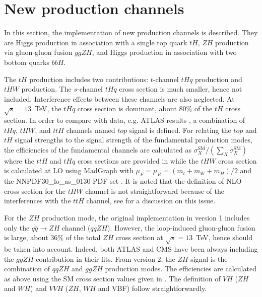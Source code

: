 \clearpage
\section{New production channels} \label{sec:new_production}
In this section, the implementation of new production channels is described. 
They are Higgs production in association with a single top quark $tH$, $ZH$ production via gluon-gluon 
fusion $ggZH$, and Higgs production in association with two bottom quarks $bbH$. 

The $tH$ production includes two contributions: $t$-channel $tHq$ production and $tHW$ production. 
The $s$-channel $tHq$ cross section is much smaller, hence not included. Interference effects between these 
channels are also neglected. At $\sqrt{s} = 13$~TeV, the $tHq$ cross section is dominant, about $80\%$ of the $tH$ cross section. 
In order to compare with data, e.g. ATLAS results \cite{Aaboud:2018xdt}, a combination of $tHq$, $tHW$, and $ttH$ channels named $top$ signal 
is defined. For relating the $top$ and $tH$ signal 
strengths to the signal strength of the fundamental production modes, 
the efficiencies of the fundamental channels are calculated as $\sigma^\text{SM}_X/(\sum_X \sigma^\text{SM}_X)$ where the $ttH$ and $tHq$ cross sections are provided in \cite{deFlorian:2016spz} while the $tHW$ cross section is 
calculated at LO using MadGraph \cite{Alwall:2014hca} with $\mu_F = \mu_R = (m_t + m_W + m_H)/2$ 
and the NNPDF30\_lo\_as\_0130 PDF set \cite{Ball:2014uwa}. It is noted that the definition of NLO cross section for the $tHW$ channel 
is not straightforward because of the interferences with the $ttH$ channel, see \cite{Demartin:2016axk} for a discussion on this issue. 

For the $ZH$ production mode, the original implementation in version 1 includes only the $q\bar{q} \to ZH$ channel ($qqZH$). 
However, the loop-induced gluon-gluon fusion is large, about $36\%$ of the total $ZH$ cross section at $\sqrt{s} = 13$~TeV, 
hence should be taken into account. Indeed, both ATLAS and CMS have been always including the $ggZH$ contribution in their fits. 
From version 2, the $ZH$ signal is the combination of $qqZH$ and $ggZH$ production modes. The efficiencies are calculated as above 
using the SM cross section values given in \cite{deFlorian:2016spz}. The definition of $VH$ ($ZH$ and $WH$) and $VVH$ ($ZH$, $WH$ and VBF) 
follow straightforwardly. 

